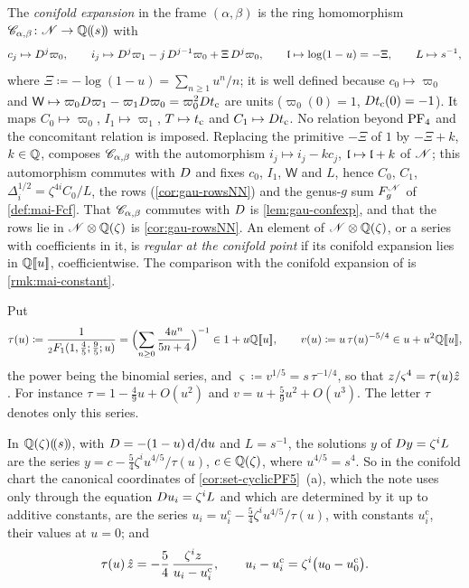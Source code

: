 \begin{defn}
The \emph{conifold expansion} in the frame $(\alpha,\beta)$ is the ring homomorphism $\mathscr{C}_{\alpha,\beta}\colon\mathscr{N}\to\mathbb{Q}(\!(s)\!)$ with
\[
c_j\mapsto D^j\varpi_0,\qquad i_j\mapsto D^j\varpi_1-j\,D^{j-1}\varpi_0+\Xi\,D^j\varpi_0,\qquad\mathfrak{l}\mapsto\log(1-u)=-\Xi,\qquad L\mapsto s^{-1},
\]
where $\Xi\coloneqq-\log(1-u)=\sum_{n\geq1}u^n/n$; it is well defined because $c_0\mapsto\varpi_0$ and $\mathsf W\mapsto\varpi_0D\varpi_1-\varpi_1D\varpi_0=\varpi_0^2Dt_{\mathrm{c}}$ are units ($\varpi_0(0)=1$, $Dt_{\mathrm{c}}(0)=-1$). It maps $C_0\mapsto\varpi_0$, $I_1\mapsto\varpi_1$, $T\mapsto t_{\mathrm{c}}$ and $C_1\mapsto Dt_{\mathrm{c}}$. No relation beyond $\mathrm{PF}_{4}$ and the concomitant relation is imposed. Replacing the primitive $-\Xi$ of $1$ by $-\Xi+k$, $k\in\mathbb{Q}$, composes $\mathscr{C}_{\alpha,\beta}$ with the automorphism $i_j\mapsto i_j-kc_j$, $\mathfrak{l}\mapsto\mathfrak{l}+k$ of $\mathscr{N}$; this automorphism commutes with $D$ and fixes $c_0$, $I_1$, $\mathsf W$ and $L$, hence $C_0$, $C_1$, $\Delta_i^{1/2}=\zeta^{4i}C_0/L$, the rows (\cref{cor:gau-rowsNN}) and the genus-$g$ sum $F_g^{\mathscr{N}}$ of \cref{def:mai-Fcf}. That $\mathscr{C}_{\alpha,\beta}$ commutes with $D$ is \cref{lem:gau-confexp}, and that the rows lie in $\mathscr{N}\otimes\mathbb{Q}(\zeta)$ is \cref{cor:gau-rowsNN}. An element of $\mathscr{N}\otimes\mathbb{Q}(\zeta)$, or a series with coefficients in it, is \emph{regular at the conifold point} if its conifold expansion lies in $\mathbb{Q}[\![ u ]\!]$, coefficientwise. The comparison with the conifold expansion of \cite{CGYZ26} is \cref{rmk:mai-constant}.
\end{defn}

\begin{defn}
\label{def:set-tau}
Put
\[
\tau(u)\coloneqq\frac1{{}_2F_1(1,\frac45;\frac95;u)}=\Bigl(\sum_{n\geq0}\frac{4u^n}{5n+4}\Bigr)^{-1}\in1+u\mathbb{Q}[\![ u ]\!],\qquad v(u)\coloneqq u\,\tau(u)^{-5/4}\in u+u^2\mathbb{Q}[\![ u ]\!],
\]
the power being the binomial series, and $\varsigma\coloneqq v^{1/5}=s\,\tau^{-1/4}$, so that $z/\varsigma^4=\tau(u)\hat{z}$. For instance $\tau=1-\frac49u+O(u^2)$ and $v=u+\frac59u^2+O(u^3)$. The letter $\tau$ denotes only this series.
\end{defn}

\begin{lem}
\label{lem:set-canon}
In $\mathbb{Q}(\zeta)(\!(s)\!)$, with $D=-(1-u)\,\mathrm{d}/\mathrm{d} u$ and $L=s^{-1}$, the solutions $y$ of $D y=\zeta^iL$ are the series $y=c-\frac54\zeta^iu^{4/5}/\tau(u)$, $c\in\mathbb{Q}(\zeta)$, where $u^{4/5}=s^4$. So in the conifold chart the canonical coordinates of \cref{cor:set-cyclicPF5}~(a), which the note uses only through the equation $D u_i=\zeta^iL$ and which are determined by it up to additive constants, are the series $u_i=u_i^{\mathrm c}-\frac54\zeta^iu^{4/5}/\tau(u)$, with constants $u_i^{\mathrm c}$, their values at $u=0$; and
\[
\tau(u)\,\hat{z}=-\frac54\,\frac{\zeta^iz}{u_i-u_i^{\mathrm c}},\qquad u_i-u_i^{\mathrm c}=\zeta^i\bigl(u_0-u_0^{\mathrm c}\bigr).
\]
\end{lem}

